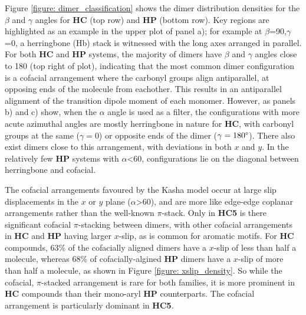 Figure \ref{figure: dimer_classification} shows the dimer distribution densities for the $\beta$ and $\gamma$ angles for \textbf{HC} (top row) and \textbf{HP} (bottom row). Key regions are highlighted as an example in the upper plot of panel a); for example at $\beta$=90,$\gamma$=0, a herringbone (Hb) stack is witnessed with the long axes arranged in parallel. For both \textbf{HC} and \textbf{HP} systems, the majority of dimers have $\beta$ and $\gamma$ angles close to 180\degree{} (top right of plot), indicating that the most common dimer configuration is a cofacial arrangement where the carbonyl groups align antiparallel, at opposing ends of the molecule from eachother. This results in an antiparallel alignment of the \sone{} transition dipole moment of each monomer.  However, as panels b) and c) show, when the $\alpha$ angle is used as a filter, the configurations with more acute azimuthal angles are mostly herringbone in nature for \textbf{HC}, with carbonyl groups at the same ($\gamma=$0\degree) or opposite ends of the dimer ($\gamma=180\degree$). There also exist dimers close to this arrangement, with deviations in both $x$ and $y$. In the relatively few \textbf{HP} systems with  $\alpha$\textless{60}\degree{}, configurations lie on the diagonal between herringbone and cofacial.

The cofacial arrangements favoured by the Kasha model occur at large slip displacements in the $x$ or $y$  plane ($\alpha$\textgreater{60}), and are more like edge-edge coplanar arrangements rather than the well-known $\pi$-stack. Only in \textbf{HC5} is there significant cofacial $\pi$-stacking between dimers, with other cofacial arrangements in \textbf{HC} and \textbf{HP} having larger $x$-slip, as is common  for aromatic motifs. For \textbf{HC} compounds, 63\% of the cofacially aligned dimers have a $x$-slip of less than half a molecule, whereas 68\% of cofacially-algined \textbf{HP} dimers have a $x$-slip of more than half a molecule, as shown in Figure \ref{figure: xslip_density}. So while the cofacial, $\pi$-stacked arrangement is rare for both families, it is more prominent in \textbf{HC} compounds than their mono-aryl \textbf{HP} counterparts. The cofacial arrangement is particularly dominant in \textbf{HC5}.


